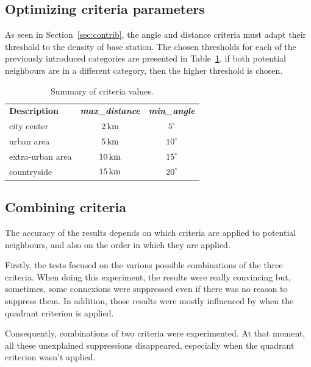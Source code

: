 \documentclass[lettersize,journal,english]{IEEEtran}
\begin{document}
    \subsection{Optimizing criteria parameters}
        As seen in Section~\ref{sec:contrib}, the angle and distance criteria must adapt their threshold to the density of base station. The chosen thresholds for each of the previously introduced categories are presented in Table~\ref{table:crit_summary}. if both potential neighbours are in a different category, then the higher threshold is chosen.
        \begin{table}
            \centering
            \caption{Summary of criteria values.}
            \label{table:crit_summary}
            \begin{tabular}{lcc}
                \toprule
                \textbf{Description} & \textbf{\emph{max\_distance}} & \textbf{\emph{min\_angle}} \\
                \cmidrule(lr){1-3}
                city center & $\unit[2]{km}$ & $5^\circ$ \\
                urban area & $\unit[5]{km}$ & $10^\circ$ \\
                extra-urban area & $\unit[10]{km}$ & $15^\circ$ \\
                countryside & $\unit[15]{km}$ & $20^\circ$ \\
                \bottomrule
            \end{tabular}
        \end{table}
    
        
    \subsection{Combining criteria}
        The accuracy of the results depends on which criteria are applied to potential neighbours, and also on the order in which they are applied.

        Firstly, the tests focused on the various possible combinations of the three criteria. When doing this experiment, the results were really convincing but, sometimes, some connexions were suppressed even if there was no reason to suppress them. In addition, those results were mostly influenced by when the quadrant criterion is applied.

        Consequently, combinations of two criteria were experimented. At that moment, all these unexplained suppressions disappeared, especially when the quadrant criterion wasn't applied.
\end{document}
